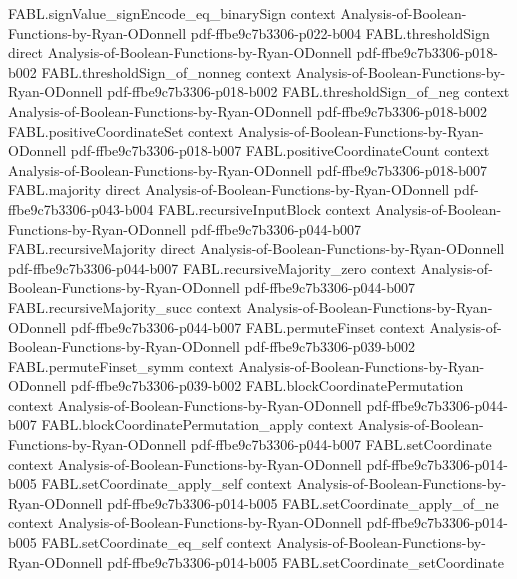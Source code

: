 \begin{theorem}
  {FABL.signValue_signEncode_eq_binarySign}
  {context}
  {Analysis-of-Boolean-Functions-by-Ryan-ODonnell}
  {pdf-ffbe9c7b3306-p022-b004}
\proofstep
  {FABL.thresholdSign}
  {direct}
  {Analysis-of-Boolean-Functions-by-Ryan-ODonnell}
  {pdf-ffbe9c7b3306-p018-b002}
\proofstep
  {FABL.thresholdSign_of_nonneg}
  {context}
  {Analysis-of-Boolean-Functions-by-Ryan-ODonnell}
  {pdf-ffbe9c7b3306-p018-b002}
\proofstep
  {FABL.thresholdSign_of_neg}
  {context}
  {Analysis-of-Boolean-Functions-by-Ryan-ODonnell}
  {pdf-ffbe9c7b3306-p018-b002}
\proofstep
  {FABL.positiveCoordinateSet}
  {context}
  {Analysis-of-Boolean-Functions-by-Ryan-ODonnell}
  {pdf-ffbe9c7b3306-p018-b007}
\proofstep
  {FABL.positiveCoordinateCount}
  {context}
  {Analysis-of-Boolean-Functions-by-Ryan-ODonnell}
  {pdf-ffbe9c7b3306-p018-b007}
\proofstep
  {FABL.majority}
  {direct}
  {Analysis-of-Boolean-Functions-by-Ryan-ODonnell}
  {pdf-ffbe9c7b3306-p043-b004}
\proofstep
  {FABL.recursiveInputBlock}
  {context}
  {Analysis-of-Boolean-Functions-by-Ryan-ODonnell}
  {pdf-ffbe9c7b3306-p044-b007}
\proofstep
  {FABL.recursiveMajority}
  {direct}
  {Analysis-of-Boolean-Functions-by-Ryan-ODonnell}
  {pdf-ffbe9c7b3306-p044-b007}
\proofstep
  {FABL.recursiveMajority_zero}
  {context}
  {Analysis-of-Boolean-Functions-by-Ryan-ODonnell}
  {pdf-ffbe9c7b3306-p044-b007}
\proofstep
  {FABL.recursiveMajority_succ}
  {context}
  {Analysis-of-Boolean-Functions-by-Ryan-ODonnell}
  {pdf-ffbe9c7b3306-p044-b007}
\proofstep
  {FABL.permuteFinset}
  {context}
  {Analysis-of-Boolean-Functions-by-Ryan-ODonnell}
  {pdf-ffbe9c7b3306-p039-b002}
\proofstep
  {FABL.permuteFinset_symm}
  {context}
  {Analysis-of-Boolean-Functions-by-Ryan-ODonnell}
  {pdf-ffbe9c7b3306-p039-b002}
\proofstep
  {FABL.blockCoordinatePermutation}
  {context}
  {Analysis-of-Boolean-Functions-by-Ryan-ODonnell}
  {pdf-ffbe9c7b3306-p044-b007}
\proofstep
  {FABL.blockCoordinatePermutation_apply}
  {context}
  {Analysis-of-Boolean-Functions-by-Ryan-ODonnell}
  {pdf-ffbe9c7b3306-p044-b007}
\proofstep
  {FABL.setCoordinate}
  {context}
  {Analysis-of-Boolean-Functions-by-Ryan-ODonnell}
  {pdf-ffbe9c7b3306-p014-b005}
\proofstep
  {FABL.setCoordinate_apply_self}
  {context}
  {Analysis-of-Boolean-Functions-by-Ryan-ODonnell}
  {pdf-ffbe9c7b3306-p014-b005}
\proofstep
  {FABL.setCoordinate_apply_of_ne}
  {context}
  {Analysis-of-Boolean-Functions-by-Ryan-ODonnell}
  {pdf-ffbe9c7b3306-p014-b005}
\proofstep
  {FABL.setCoordinate_eq_self}
  {context}
  {Analysis-of-Boolean-Functions-by-Ryan-ODonnell}
  {pdf-ffbe9c7b3306-p014-b005}
\proofstep
  {FABL.setCoordinate_setCoordinate}

\end{theorem}
